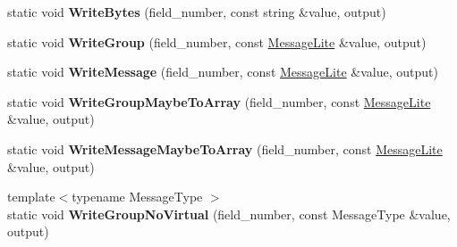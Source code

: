 \begin{DoxyCompactItemize}
\item 
\mbox{\label{classgoogle_1_1protobuf_1_1internal_1_1WireFormatLite_a5125634e40a343857ab301416974e848}} 
static void {\bfseries Write\+Bytes} (field\+\_\+number, const string \&value, output)
\item 
\mbox{\label{classgoogle_1_1protobuf_1_1internal_1_1WireFormatLite_a899b0adca1b491b0cab3941edbc70af1}} 
static void {\bfseries Write\+Group} (field\+\_\+number, const \hyperlink{classgoogle_1_1protobuf_1_1MessageLite}{Message\+Lite} \&value, output)
\item 
\mbox{\label{classgoogle_1_1protobuf_1_1internal_1_1WireFormatLite_adcc02f66dba5d3d9ae8d87f003210c2e}} 
static void {\bfseries Write\+Message} (field\+\_\+number, const \hyperlink{classgoogle_1_1protobuf_1_1MessageLite}{Message\+Lite} \&value, output)
\item 
\mbox{\label{classgoogle_1_1protobuf_1_1internal_1_1WireFormatLite_a28ba85accd650e0bb29375e84e5a59e4}} 
static void {\bfseries Write\+Group\+Maybe\+To\+Array} (field\+\_\+number, const \hyperlink{classgoogle_1_1protobuf_1_1MessageLite}{Message\+Lite} \&value, output)
\item 
\mbox{\label{classgoogle_1_1protobuf_1_1internal_1_1WireFormatLite_a8278bc20346ebef174faa2430656949e}} 
static void {\bfseries Write\+Message\+Maybe\+To\+Array} (field\+\_\+number, const \hyperlink{classgoogle_1_1protobuf_1_1MessageLite}{Message\+Lite} \&value, output)
\item 
\mbox{\label{classgoogle_1_1protobuf_1_1internal_1_1WireFormatLite_a5ed44eec564fcc33e7099bfe8e95b5c5}} 
{\footnotesize template$<$typename Message\+Type $>$ }\\static void {\bfseries Write\+Group\+No\+Virtual} (field\+\_\+number, const Message\+Type \&value, output)
\item 
\mbox{\label{classgoogle_1_1protobuf_1_1internal_1_1WireFormatLite_ac8edbcaee63ebf1db5b38a9ffd1b156c}} 

\end{DoxyCompactItemize}
